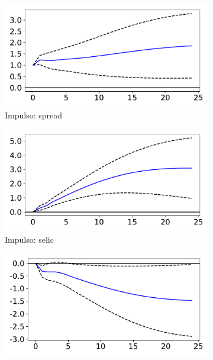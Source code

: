 \documentclass[a4paper,
               article,
               12pt,
               openany,
               oneside,
               english,
               brazil]{abntex2}
\numberwithin{equation}{section}
\begin{document}
    \begin{figure}[h!bt]
        \caption{Função de impulso-resposta (spread)}
        \begin{subfigure}[t]{.5\linewidth}
            \includegraphics[width = \textwidth, scale=1]{irf/spread_spread.pdf}
            \caption{Impulso: spread}
        \end{subfigure}
        \begin{subfigure}[t]{.5\linewidth}
            \includegraphics[width = \textwidth, scale=1]{irf/spread_selic.pdf}
            \caption{Impulso: selic}
        \end{subfigure}
        \begin{subfigure}[t]{.5\linewidth}
            \includegraphics[width = \textwidth, scale=1]{irf/spread_inad.pdf}

\end{subfigure}
\end{figure}
\end{document}
